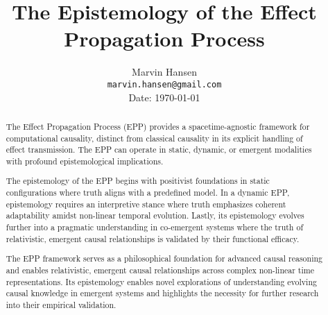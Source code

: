 \documentclass{article}
\title{The Epistemology of the Effect Propagation Process}
\author{
  Marvin Hansen \\
  \texttt{marvin.hansen@gmail.com} \\
   Date: \today
}
\begin{document}
\maketitle

\begin{abstract}
The Effect Propagation Process (EPP) provides a spacetime-agnostic framework for computational causality, distinct from classical causality in its explicit handling of effect transmission. The EPP can operate in static, dynamic, or emergent modalities with profound epistemological implications.


The epistemology of the EPP begins with positivist foundations in static configurations where truth aligns with a predefined model. In a dynamic EPP, epistemology requires an interpretive stance where truth emphasizes coherent adaptability amidst non-linear temporal evolution. Lastly, its epistemology evolves further into a pragmatic understanding in co-emergent systems where the truth of relativistic, emergent causal relationships is validated by their functional efficacy.


The EPP framework serves as a philosophical foundation for advanced causal reasoning and enables relativistic, emergent causal relationships across complex non-linear time representations. Its epistemology enables novel explorations of understanding evolving causal knowledge in emergent systems and highlights the necessity for further research into their empirical validation.

\end{abstract}





  
  
\end{document}
